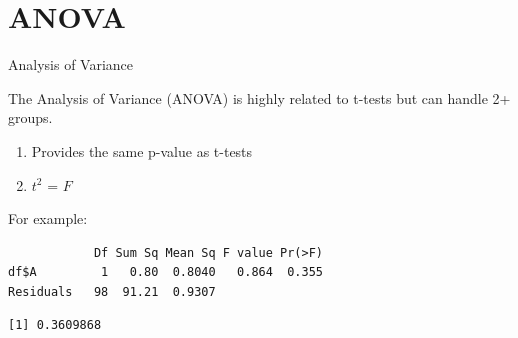 \section{ANOVA}\label{anova}

\begin{frame}[fragile]{Analysis of Variance}

The Analysis of Variance (ANOVA) is highly related to t-tests but can
handle 2+ groups.

\begin{enumerate}
\def\labelenumi{\arabic{enumi}.}
\tightlist
\item
  Provides the same p-value as t-tests
\item
  \(t^2\) = \(F\)
\end{enumerate}

For example:

\begin{Shaded}
\begin{Highlighting}[]
\StringTok{ }\OperatorTok{$}\OperatorTok{~}\StringTok{ }\OperatorTok{$}
\end{Highlighting}
\end{Shaded}

\begin{verbatim}
            Df Sum Sq Mean Sq F value Pr(>F)
df$A         1   0.80  0.8040   0.864  0.355
Residuals   98  91.21  0.9307               
\end{verbatim}

\begin{Shaded}
\begin{Highlighting}[]
\OperatorTok{$}\OperatorTok{~}\StringTok{ }\OperatorTok{$}\OperatorTok{$}
\end{Highlighting}
\end{Shaded}

\begin{verbatim}
[1] 0.3609868
\end{verbatim}

\end{frame}

